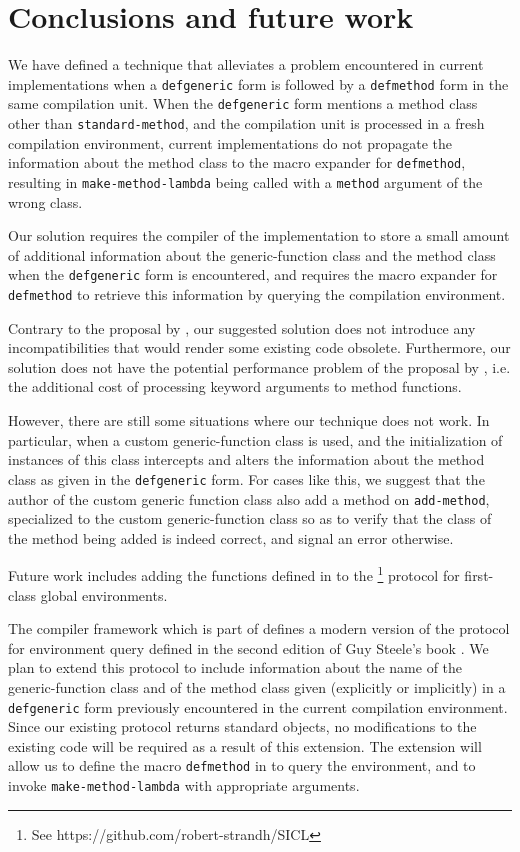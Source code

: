 \section{Conclusions and future work}
\label{sec-conclusions}

We have defined a technique that alleviates a problem encountered in
current \commonlisp{} implementations when a \texttt{defgeneric} form
is followed by a \texttt{defmethod} form in the same compilation
unit.  When the \texttt{defgeneric} form mentions a method class other
than \texttt{standard-method}, and the compilation unit is processed
in a fresh compilation environment, current implementations do not
propagate the information about the method class to the macro expander
for \texttt{defmethod}, resulting in \texttt{make-method-lambda} being
called with a \texttt{method} argument of the wrong class.

Our solution requires the compiler of the \commonlisp{} implementation
to store a small amount of additional information about the
generic-function class and the method class when the
\texttt{defgeneric} form is encountered, and requires the macro
expander for \texttt{defmethod} to retrieve this information by
querying the compilation environment.

Contrary to the proposal by \cnh{}, our suggested solution does not
introduce any incompatibilities that would render some existing code
obsolete.  Furthermore, our solution does not have the potential
performance problem of the proposal by \cnh{}, i.e. the additional
cost of processing keyword arguments to method functions.

However, there are still some situations where our technique does not
work.  In particular, when a custom generic-function class is used,
and the initialization of instances of this class intercepts and
alters the information about the method class as given in the
\texttt{defgeneric} form.  For cases like this, we suggest that the
author of the custom generic function class also add a method on
\texttt{add-method}, specialized to the custom generic-function class
so as to verify that the class of the method being added is indeed
correct, and signal an error otherwise.

Future work includes adding the functions defined in
 to the \sicl{}%
\footnote{See https://github.com/robert-strandh/SICL} protocol for
first-class global environments.

The \cleavir{} compiler framework which is part of \sicl{} defines a
modern version of the protocol for environment query defined in the
second edition of Guy Steele's book \cite{Steele:1990:CLL:95411}.  We
plan to extend this protocol to include information about the name of
the generic-function class and of the method class given (explicitly
or implicitly) in a \texttt{defgeneric} form previously encountered in
the current compilation environment.  Since our existing protocol
returns standard objects, no modifications to the existing \cleavir{}
code will be required as a result of this extension.  The extension
will allow us to define the macro \texttt{defmethod} in \sicl{} to
query the environment, and to invoke \texttt{make-method-lambda} with
appropriate arguments.
